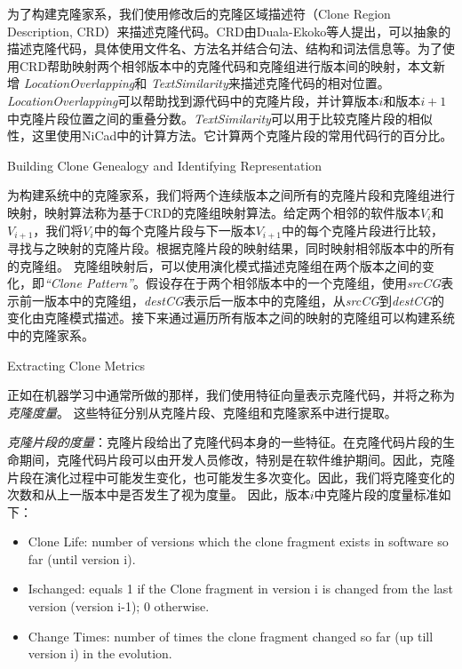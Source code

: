 为了构建克隆家系，我们使用修改后的克隆区域描述符（Clone Region Description, CRD）来描述克隆代码。CRD由Duala-Ekoko等人提出，可以抽象的描述克隆代码，具体使用文件名、方法名并结合句法、结构和词法信息等\cite{duala2010clone}。为了使用CRD帮助映射两个相邻版本中的克隆代码和克隆组进行版本间的映射，本文新增\emph{ LocationOverlapping}和\emph{ TextSimilarity}来描述克隆代码的相对位置\cite{}。{\em LocationOverlapping}可以帮助找到源代码中的克隆片段\cite{kim2005empirical}，并计算版本$ i $和版本$ i + 1 $中克隆片段位置之间的重叠分数。{\em TextSimilarity}可以用于比较克隆片段的相似性，这里使用NiCad中的计算方法。它计算两个克隆片段的常用代码行的百分比。

{Building Clone Genealogy and Identifying Representation}

为构建系统中的克隆家系，我们将两个连续版本之间所有的克隆片段和克隆组进行映射，映射算法称为基于CRD的克隆组映射算法\cite{}。给定两个相邻的软件版本\emph{$V_i$}和\emph{$V_ {i + 1}$}，我们将\emph{$V_i$}中的每个克隆片段与下一版本\emph{$ V_{i+1}$}中的每个克隆片段进行比较，寻找与之映射的克隆片段。根据克隆片段的映射结果，同时映射相邻版本中的所有的克隆组。 
克隆组映射后，可以使用演化模式描述克隆组在两个版本之间的变化，即\emph{``Clone Pattern''}。假设存在于两个相邻版本中的一个克隆组，使用\emph{srcCG}表示前一版本中的克隆组，\emph{destCG}表示后一版本中的克隆组，从\emph{srcCG}到\emph{destCG}的变化由克隆模式描述。接下来通过遍历所有版本之间的映射的克隆组可以构建系统中的克隆家系。


{ Extracting Clone Metrics}

正如在机器学习中通常所做的那样，我们使用特征向量表示克隆代码，并将之称为{\em 克隆度量}。 这些特征分别从克隆片段、克隆组和克隆家系中进行提取。

{\em 克隆片段的度量}：克隆片段给出了克隆代码本身的一些特征。在克隆代码片段的生命期间，克隆代码片段可以由开发人员修改，特别是在软件维护期间。因此，克隆片段在演化过程中可能发生变化，也可能发生多次变化。因此，我们将克隆变化的次数和从上一版本中是否发生了视为度量。 因此，版本$ i $中克隆片段的度量标准如下：
\begin{itemize}
\item {Clone Life}: number of versions which the clone fragment exists in software so far (until version i).
\item {Ischanged}:	equals 1 if the Clone fragment in version i is changed from the last version (version i-1); 0 otherwise.
\item {Change Times}:	number of times the clone fragment changed so far (up till version i) in the evolution.  
\end{itemize}

